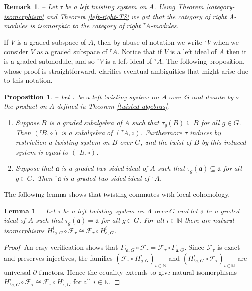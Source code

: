\documentclass[twoside,11pt]{article}
\newcommand{\N}{{\mathbb N}}
\newcommand{\F}{{\mathcal F}}
\renewcommand{\a}{{\mathfrak a}}
\newtheorem{subproposition}[subtheorem]{Proposition}
\newtheorem{sublemma}[subtheorem]{Lemma}
\newtheorem{subremark}[subtheorem]{Remark}
\begin{document}
\begin{subremark} -- \rm \label{left-right-cat-isomorphism}
Let $\tau$ be a left twisting system on $A$. Using Theorem \ref{category-isomorphism} and 
Theorem \ref{left-right-TS} we get that the category of right $A$-modules is isomorphic to
the category of right ${}^\tau\! A$-modules.
\end{subremark}

If $V$ is a graded subspace of $A$, then by abuse of notation we write ${}^\tau V$ when we
consider $V$ as a graded subspace of ${}^\tau A$. Notice that if $V$ is a left ideal of $A$
then it is a graded submodule, and so ${}^\tau V$ is a left ideal of ${}^\tau A$. The
following proposition, whose proof is straightforward, clarifies eventual ambiguities that
might arise due to this notation.
\begin{subproposition} -- \label{Z-twist-on-subalgebras}
Let $\tau$ be a left twisting system on $A$ over $G$ and denote by $\circ$ the product on
$A$ defined in Theorem \ref{twisted-algebras}. 
\begin{enumerate}
	\item Suppose $B$ is a graded subalgebra of $A$ such that $\tau_g(B) \subseteq B$
		for all $g \in G$. Then $({}^\tau\! B, \circ)$ is a subalgebra of
		$({}^\tau\! A, \circ)$. Furthermore $\tau$ induces by restriction a
		twisting system on $B$ over $G$, and the twist of $B$ by this induced
		system is equal to $({}^\tau\! B, \circ)$.
	
	\item Suppose that $\a$ is a graded two-sided ideal of $A$ such that $\tau_g(\a)
		\subseteq \a$ for all $g \in G$. Then ${}^\tau\! \a$ is a graded two-sided
		ideal of ${}^\tau\! A$.
	\end{enumerate}
\end{subproposition}

The following lemma shows that twisting commutes with local cohomology.

\begin{sublemma} -- \label{twisting-torsion}
Let $\tau$ be a left twisting system on $A$ over $G$ and let $\a$ be a graded
ideal of $A$ such that $\tau_g(\a) = \a$ for all $g \in G$. For all $i \in \N$ there are
natural isomorphisms $H_{{}^\tau\! \a,G}^i \circ \F_\tau\cong \F_\tau\circ H_{\a,G}^i$.
\end{sublemma}
 
\begin{proof} An easy verification shows that $\Gamma_{{}^\tau\! \a,G} \circ \F_\tau =
\F_\tau\circ \Gamma_{\a,G}$. Since $\F_\tau$ is exact and preserves injectives, the
families $(\F_\tau\circ H_{\a,G}^i)_{i\in\N}$ and
$(H_{^\tau\!\a,G}^i\circ\F_\tau)_{i\in\N}$ are universal $\partial$-functors.  
Hence the equality extends to give natural isomorphisms
$H_{{}^\tau\!\a,G}^i \circ \F_\tau\cong \F_\tau\circ H_{\a,G}^i$ for all $i \in\N$.\end{proof}
\end{document}
